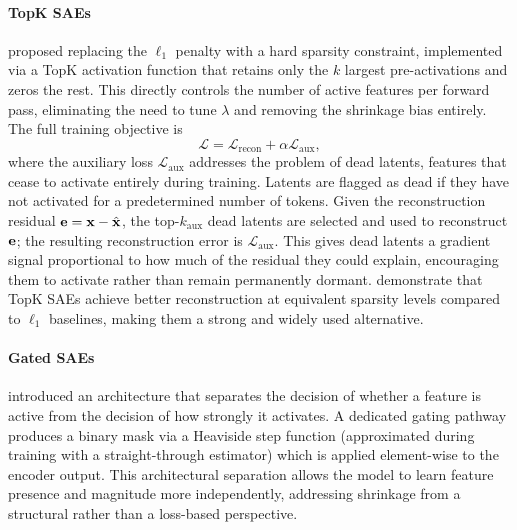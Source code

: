     \paragraph{TopK SAEs} \citet{gaoScalingEvaluatingSparse2024} proposed
    replacing the $\ell_{1}$ penalty with a hard sparsity constraint,
    implemented via a TopK activation function that retains only the $k$ largest
    pre-activations and zeros the rest. This directly controls the number of
    active features per forward pass, eliminating the need to tune $\lambda$ and
    removing the shrinkage bias entirely. The full training objective is
    \begin{equation} \label{eq:background:ae:sae:topk-loss}
        \mathcal{L} = \mathcal{L}_{\mathrm{recon}} + \alpha
        \mathcal{L}_{\mathrm{aux}},
    \end{equation}
    where the auxiliary loss $\mathcal{L}_{\mathrm{aux}}$ addresses the problem
    of dead latents, \ie features that cease to activate entirely during
    training. Latents are flagged as dead if they have not activated for a
    predetermined number of tokens. Given the reconstruction residual $\vb{e} =
    \vb{x} - \hat{\vb{x}}$, the top-$k_{\mathrm{aux}}$ dead latents are selected
    and used to reconstruct $\vb{e}$; the resulting reconstruction error is
    $\mathcal{L}_{\mathrm{aux}}$. This gives dead latents a gradient signal
    proportional to how much of the residual they could explain, encouraging
    them to activate rather than remain permanently dormant.
    \citet{gaoScalingEvaluatingSparse2024} demonstrate that TopK \acp{SAE}
    achieve better reconstruction at equivalent sparsity levels compared to
    $\ell_{1}$ baselines, making them a strong and widely used alternative.

    \paragraph{Gated SAEs} \citet{rajamanoharanImprovingSparseDecomposition2024}
    introduced an architecture that separates the decision of whether a feature
    is active from the decision of how strongly it activates. A dedicated gating
    pathway produces a binary mask via a Heaviside step function (approximated
    during training with a straight-through estimator) which is applied
    element-wise to the encoder output. This architectural separation allows the
    model to learn feature presence and magnitude more independently, addressing
    shrinkage from a structural rather than a loss-based perspective.

